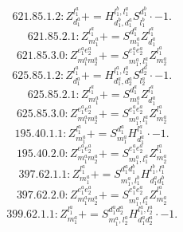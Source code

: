 \documentclass[letterpaper,10pt,fleqn,leqno,onecolumn]{article}
\begin{document}
\begin{equation} \;\;\;\;\;\;  621.85.1.2: Z^{l_{1}^{a}}_{d_{1}^{a}}+=H^{l_{1}^{b},l_{1}^{a}}_{d_{1}^{b},d_{1}^{a}}S^{d_{1}^{b}}_{l_{1}^{b}}\cdot -1. \end{equation}
\begin{equation} \;\;\;\;\;\;  621.85.2.1: Z^{l_{1}^{a}}_{m_{1}^{a}}+=S^{d_{1}^{a}}_{m_{1}^{a}}Z^{l_{1}^{a}}_{d_{1}^{a}} \end{equation}
\begin{equation} \;\;\;\;\;\;  621.85.3.0: Z^{e_{1}^{a}e_{2}^{a}}_{m_{1}^{a}m_{2}^{a}}+=S^{e_{1}^{a}e_{2}^{a}}_{m_{1}^{a},l_{1}^{a}}Z^{l_{1}^{a}}_{m_{2}^{a}} \end{equation}
\begin{equation} \;\;\;\;\;\;  625.85.1.2: Z^{l_{1}^{a}}_{d_{1}^{a}}+=H^{l_{1}^{a},l_{2}^{a}}_{d_{1}^{a},d_{2}^{a}}S^{d_{2}^{a}}_{l_{2}^{a}}\cdot -1. \end{equation}
\begin{equation} \;\;\;\;\;\;  625.85.2.1: Z^{l_{1}^{a}}_{m_{1}^{a}}+=S^{d_{1}^{a}}_{m_{1}^{a}}Z^{l_{1}^{a}}_{d_{1}^{a}} \end{equation}
\begin{equation} \;\;\;\;\;\;  625.85.3.0: Z^{e_{1}^{a}e_{2}^{a}}_{m_{1}^{a}m_{2}^{a}}+=S^{e_{1}^{a}e_{2}^{a}}_{m_{1}^{a},l_{1}^{a}}Z^{l_{1}^{a}}_{m_{2}^{a}} \end{equation}
\begin{equation} \;\;\;\;\;\;  195.40.1.1: Z^{l_{1}^{a}}_{m_{1}^{a}}+=S^{d_{1}^{a}}_{m_{1}^{a}}H^{l_{1}^{a}}_{d_{1}^{a}}\cdot -1. \end{equation}
\begin{equation} \;\;\;\;\;\;  195.40.2.0: Z^{e_{1}^{a}e_{2}^{a}}_{m_{1}^{a}m_{2}^{a}}+=S^{e_{1}^{a}e_{2}^{a}}_{m_{1}^{a},l_{1}^{a}}Z^{l_{1}^{a}}_{m_{2}^{a}} \end{equation}
\begin{equation} \;\;\;\;\;\;  397.62.1.1: Z^{l_{1}^{a}}_{m_{1}^{a}}+=S^{d_{1}^{a}d_{1}^{b}}_{m_{1}^{a},l_{1}^{b}}H^{l_{1}^{b},l_{1}^{a}}_{d_{1}^{a}d_{1}^{b}} \end{equation}
\begin{equation} \;\;\;\;\;\;  397.62.2.0: Z^{e_{1}^{a}e_{2}^{a}}_{m_{1}^{a}m_{2}^{a}}+=S^{e_{1}^{a}e_{2}^{a}}_{m_{1}^{a},l_{1}^{a}}Z^{l_{1}^{a}}_{m_{2}^{a}} \end{equation}
\begin{equation} \;\;\;\;\;\;  399.62.1.1: Z^{l_{1}^{a}}_{m_{1}^{a}}+=S^{d_{1}^{a}d_{2}^{a}}_{m_{1}^{a},l_{2}^{a}}H^{l_{1}^{a},l_{2}^{a}}_{d_{1}^{a}d_{2}^{a}}\cdot -1. \end{equation}
\end{document}
